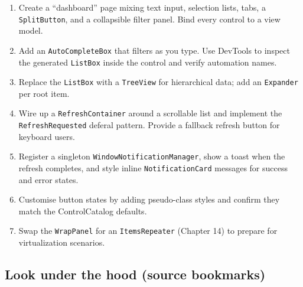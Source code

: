 \begin{enumerate}
\def\labelenumi{\arabic{enumi}.}
\tightlist
\item
  Create a ``dashboard'' page mixing text input, selection lists, tabs,
  a \passthrough{\lstinline!SplitButton!}, and a collapsible filter
  panel. Bind every control to a view model.
\item
  Add an \passthrough{\lstinline!AutoCompleteBox!} that filters as you
  type. Use DevTools to inspect the generated
  \passthrough{\lstinline!ListBox!} inside the control and verify
  automation names.
\item
  Replace the \passthrough{\lstinline!ListBox!} with a
  \passthrough{\lstinline!TreeView!} for hierarchical data; add an
  \passthrough{\lstinline!Expander!} per root item.
\item
  Wire up a \passthrough{\lstinline!RefreshContainer!} around a
  scrollable list and implement the
  \passthrough{\lstinline!RefreshRequested!} deferal pattern. Provide a
  fallback refresh button for keyboard users.
\item
  Register a singleton
  \passthrough{\lstinline!WindowNotificationManager!}, show a toast when
  the refresh completes, and style inline
  \passthrough{\lstinline!NotificationCard!} messages for success and
  error states.
\item
  Customise button states by adding pseudo-class styles and confirm they
  match the ControlCatalog defaults.
\item
  Swap the \passthrough{\lstinline!WrapPanel!} for an
  \passthrough{\lstinline!ItemsRepeater!} (Chapter 14) to prepare for
  virtualization scenarios.
\end{enumerate}

\subsection{Look under the hood (source
bookmarks)}\label{look-under-the-hood-source-bookmarks-4}

